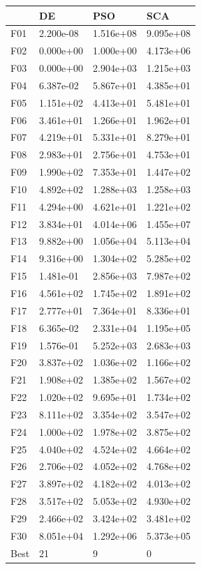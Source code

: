 \begin{tabular}{llll}
\toprule
{} &         DE &        PSO &        SCA \\
\midrule
F01  &  2.200e-08 &  1.516e+08 &  9.095e+08 \\
F02  &  0.000e+00 &  1.000e+00 &  4.173e+06 \\
F03  &  0.000e+00 &  2.904e+03 &  1.215e+03 \\
F04  &  6.387e-02 &  5.867e+01 &  4.385e+01 \\
F05  &  1.151e+02 &  4.413e+01 &  5.481e+01 \\
F06  &  3.461e+01 &  1.266e+01 &  1.962e+01 \\
F07  &  4.219e+01 &  5.331e+01 &  8.279e+01 \\
F08  &  2.983e+01 &  2.756e+01 &  4.753e+01 \\
F09  &  1.990e+02 &  7.353e+01 &  1.447e+02 \\
F10  &  4.892e+02 &  1.288e+03 &  1.258e+03 \\
F11  &  4.294e+00 &  4.621e+01 &  1.221e+02 \\
F12  &  3.834e+01 &  4.014e+06 &  1.455e+07 \\
F13  &  9.882e+00 &  1.056e+04 &  5.113e+04 \\
F14  &  9.316e+00 &  1.304e+02 &  5.285e+02 \\
F15  &  1.481e-01 &  2.856e+03 &  7.987e+02 \\
F16  &  4.561e+02 &  1.745e+02 &  1.891e+02 \\
F17  &  2.777e+01 &  7.364e+01 &  8.336e+01 \\
F18  &  6.365e-02 &  2.331e+04 &  1.195e+05 \\
F19  &  1.576e-01 &  5.252e+03 &  2.683e+03 \\
F20  &  3.837e+02 &  1.036e+02 &  1.166e+02 \\
F21  &  1.908e+02 &  1.385e+02 &  1.567e+02 \\
F22  &  1.020e+02 &  9.695e+01 &  1.734e+02 \\
F23  &  8.111e+02 &  3.354e+02 &  3.547e+02 \\
F24  &  1.000e+02 &  1.978e+02 &  3.875e+02 \\
F25  &  4.040e+02 &  4.524e+02 &  4.664e+02 \\
F26  &  2.706e+02 &  4.052e+02 &  4.768e+02 \\
F27  &  3.897e+02 &  4.182e+02 &  4.013e+02 \\
F28  &  3.517e+02 &  5.053e+02 &  4.930e+02 \\
F29  &  2.466e+02 &  3.424e+02 &  3.481e+02 \\
F30  &  8.051e+04 &  1.292e+06 &  5.373e+05 \\
Best &         21 &          9 &          0 \\
\bottomrule
\end{tabular}
